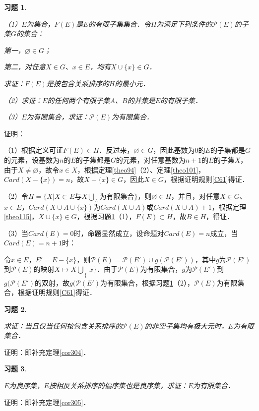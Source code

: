 \documentclass[12pt, a4paper, oneside]{book}
\newtheorem{exer}{习题}
\begin{document}
			\begin{exer}\label{exer127}
				\hfill\par
				（1）$E$为集合，$F(E)$是$E$的有限子集集合．令$H$为满足下列条件的$\mathcal{P}(E)$的子集$G$的集合：
				\par
				第一，$\varnothing\in G$；
				\par
				第二，对任意$X\in G$、$x\in E$，均有$X\cup\{x\}\in G$．
				\par
				求证：$F(E)$是按包含关系排序的$H$的最小元．
				\par
				（2）求证：$E$的任何两个有限子集$A$、$B$的并集是$E$的有限子集．
				\par
				（3）$E$为有限集合，求证：$\mathcal{P}(E)$为有限集合．
			\end{exer}
			证明：
			\par
			（1）根据定义可证$F(E)\in H$．反过来，$\varnothing\in G$，因此基数为$0$的$E$的子集都是$G$的元素，设基数为$n$的$E$的子集都是$G$的元素，对任意基数为$n+1$的$E$的子集$X$，由于$X\neq \varnothing$，故令$x\in X$，根据定理\ref{theo94}（2）、定理\ref{theo101}，$Card(X-\{x\})=n$，故$X-\{x\}\in G$，因此$X\in G$，根据证明规则\ref{C61}得证．
			\par
			（2）令$H=\{X|X\subset E\text{与}X\bigcup\limits_A\text{为有限集合}\}$，则$\varnothing\in H$，并且，对任意$X\in G$、$x\in E$，$Card(X\cup A\cup\{x\})$为$Card(X\cup A)$或$Card(X\cup A)+1$，根据定理\ref{theo115}，$X\cup\{x\}\in G$，根据习题\ref{exer127}（1），$F(E)\subset H$，故$B\in H$，得证．
			\par
			（3）当$Card(E)=0$时，命题显然成立，设命题对$Card(E)=n$成立，当$Card(E)=n+1$时：
			\par
			令$x\in E$，$E'=E-\{x\}$，则$\mathcal{P}(E)=\mathcal{P}(E')\cup g(\mathcal{P}(E'))$，其中$g$为$\mathcal{P}(E')$到$\mathcal{P}(E)$的映射$X\mapsto X\bigcup\limits_\{x\}$．由于$\mathcal{P}(E)$为有限集合，$g$为$\mathcal{P}(E')$到$g(\mathcal{P}(E')$的双射，故$g(\mathcal{P}(E')$为有限集合，根据习题\ref{exer127}（2），$\mathcal{P}(E)$为有限集合，根据证明规则\ref{C61}得证．
			
			\begin{exer}\label{exer128}
				\hfill\par
				求证：当且仅当任何按包含关系排序的$\mathcal{P}(E)$的非空子集均有极大元时，$E$为有限集合．
			\end{exer}
			证明：即补充定理\ref{cor304}．
			
			\begin{exer}\label{exer129}
				\hfill\par
				$E$为良序集，$E$按相反关系排序的偏序集也是良序集，求证：$E$为有限集合．
			\end{exer}
			证明：即补充定理\ref{cor305}．
			
\end{document}
